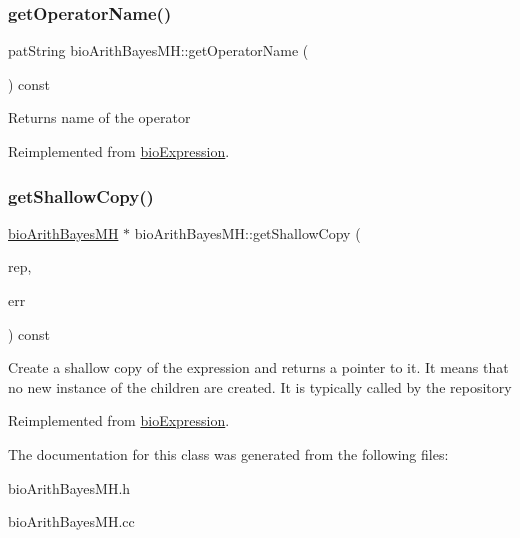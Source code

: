 \subsubsection{\texorpdfstring{get\+Operator\+Name()}{getOperatorName()}}
{\footnotesize\ttfamily pat\+String bio\+Arith\+Bayes\+M\+H\+::get\+Operator\+Name (\begin{DoxyParamCaption}{ }\end{DoxyParamCaption}) const\hspace{0.3cm}{\ttfamily [virtual]}}

\begin{DoxyReturn}{Returns}
name of the operator 
\end{DoxyReturn}


Reimplemented from \hyperlink{classbio_expression_a2353a4afb3a2b0af7c63aba086a72bde}{bio\+Expression}.

\mbox{\label{classbio_arith_bayes_m_h_ab173e10b34d0eab2599ba4854f928b8f}} 
\subsubsection{\texorpdfstring{get\+Shallow\+Copy()}{getShallowCopy()}}
{\footnotesize\ttfamily \hyperlink{classbio_arith_bayes_m_h}{bio\+Arith\+Bayes\+MH} $\ast$ bio\+Arith\+Bayes\+M\+H\+::get\+Shallow\+Copy (\begin{DoxyParamCaption}\item[{\hyperlink{classbio_expression_repository}{bio\+Expression\+Repository} $\ast$}]{rep,  }\item[{pat\+Error $\ast$\&}]{err }\end{DoxyParamCaption}) const\hspace{0.3cm}{\ttfamily [virtual]}}

Create a shallow copy of the expression and returns a pointer to it. It means that no new instance of the children are created. It is typically called by the repository 

Reimplemented from \hyperlink{classbio_expression_a442534762693b92baaf33928979a1bf8}{bio\+Expression}.



The documentation for this class was generated from the following files\+:\begin{DoxyCompactItemize}
\item 
bio\+Arith\+Bayes\+M\+H.\+h\item 
bio\+Arith\+Bayes\+M\+H.\+cc\end{DoxyCompactItemize}
